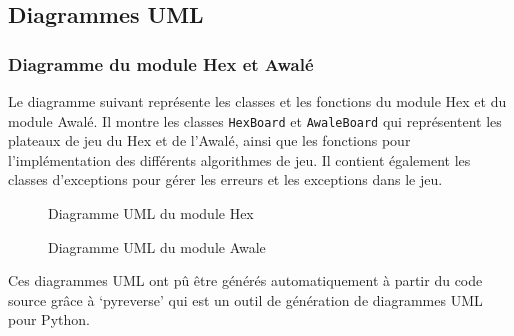 \subsection{Diagrammes UML}

\subsubsection{Diagramme du module Hex et Awalé}

Le diagramme suivant représente les classes et les fonctions du module Hex et du module Awalé.
Il montre les classes \texttt{HexBoard} et \texttt{AwaleBoard} qui représentent les plateaux de jeu
du Hex et de l'Awalé, ainsi que les fonctions pour l'implémentation des différents algorithmes de jeu.
Il contient également les classes d'exceptions pour gérer les erreurs et les exceptions dans le jeu.

\begin{figure}[!htb]
    \centering
    \caption{Diagramme UML du module Hex}\label{Fig:UML_hex}
\end{figure}
\begin{figure}[!htb]
    \centering
    \caption{Diagramme UML du module Awale}\label{Fig:UML_awale}
\end{figure}

Ces diagrammes UML ont pû être générés automatiquement à partir du code source grâce à 
`pyreverse' qui est un outil de génération de diagrammes UML pour Python.

